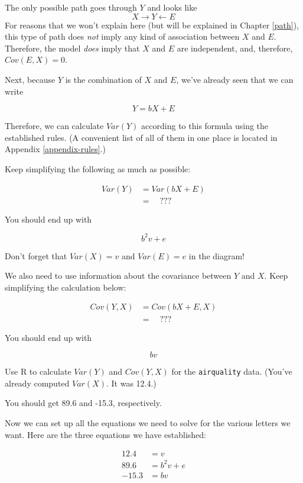 \documentclass[
]{book}
\begin{document}
The only possible path goes through \(Y\) and looks like
\[
X \boldsymbol{\rightarrow} Y \leftarrow E
\]
For reasons that we won't explain here (but will be explained in Chapter \ref{path}), this type of path does \emph{not} imply any kind of association between \(X\) and \(E\). Therefore, the model \emph{does} imply that \(X\) and \(E\) are independent, and, therefore, \(Cov(E, X) = 0\).

Next, because \(Y\) is the combination of \(X\) and \(E\), we've already seen that we can write

\[
Y = bX + E
\]

Therefore, we can calculate \(Var(Y)\) according to this formula using the established rules. (A convenient list of all of them in one place is located in Appendix \ref{appendix-rules}.)

Keep simplifying the following as much as possible:

\begin{align}
Var(Y)  &= Var(bX + E) \\
        &= \quad ???
\end{align}

You should end up with

\[
b^{2}v + e
\]

Don't forget that \(Var(X) = v\) and \(Var(E) = e\) in the diagram!

We also need to use information about the covariance between \(Y\) and \(X\). Keep simplifying the calculation below:

\begin{align}
Cov(Y, X)  &= Cov(bX + E, X) \\
        &= \quad ???
\end{align}

You should end up with

\[
bv
\]

Use R to calculate \(Var(Y)\) and \(Cov(Y, X)\) for the \texttt{airquality} data. (You've already computed \(Var(X)\). It was 12.4.)

You should get 89.6 and -15.3, respectively.

Now we can set up all the equations we need to solve for the various letters we want. Here are the three equations we have established:

\begin{align}
12.4 &= v \\
89.6 &= b^2v + e \\
-15.3 &= bv
\end{align}
\end{document}
